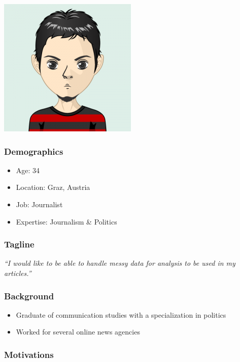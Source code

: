 \includegraphics[scale=0.5]{figures/requirements/persona-avatar-bob}

\subsubsection{Demographics}

\begin{itemize}
    \item Age: 34
    \item Location: Graz, Austria
    \item Job: Journalist
    \item Expertise: Journalism \& Politics
\end{itemize}

\subsubsection{Tagline}

\textit{``I would like to be able to handle messy data for analysis to be used in my articles.''}

\subsubsection{Background}

\begin{itemize}
    \item Graduate of communication studies with a specialization in politics
    \item Worked for several online news agencies
\end{itemize}

\subsubsection{Motivations}

